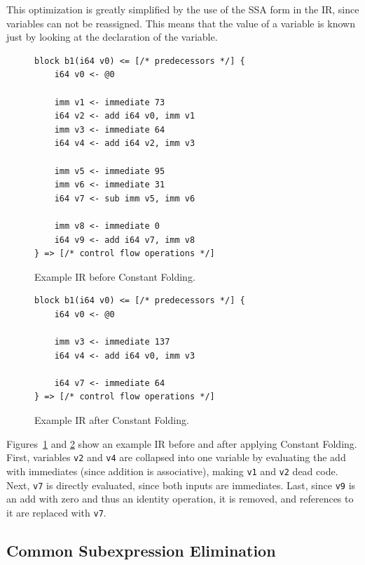 \documentclass[course=eragp]{aspdoc}
\begin{document}
This optimization is greatly simplified by the use of the SSA form in the IR, since variables can not be
reassigned. This means that the value of a variable is known just by looking at the declaration of the variable.

\begin{figure}[H]
    \centering
    \begin{lstlisting}[]
block b1(i64 v0) <= [/* predecessors */] {
    i64 v0 <- @0

    imm v1 <- immediate 73
    i64 v2 <- add i64 v0, imm v1
    imm v3 <- immediate 64
    i64 v4 <- add i64 v2, imm v3

    imm v5 <- immediate 95
    imm v6 <- immediate 31
    i64 v7 <- sub imm v5, imm v6

    imm v8 <- immediate 0
    i64 v9 <- add i64 v7, imm v8
} => [/* control flow operations */]
\end{lstlisting}
    \caption{Example IR before Constant Folding.}\label{fig:const_folding_example_before}
\end{figure}

\begin{figure}[H]
    \centering
    \begin{lstlisting}[]
block b1(i64 v0) <= [/* predecessors */] {
    i64 v0 <- @0

    imm v3 <- immediate 137
    i64 v4 <- add i64 v0, imm v3

    i64 v7 <- immediate 64
} => [/* control flow operations */]
\end{lstlisting}
    \caption{Example IR after Constant Folding.}\label{fig:const_folding_example_after}
\end{figure}

Figures~\ref{fig:const_folding_example_before} and \ref{fig:const_folding_example_after} show an example IR before and
after applying Constant Folding. First, variables \texttt{v2} and \texttt{v4} are collapsed into one variable by
evaluating the add with immediates (since addition is associative), making \texttt{v1} and \texttt{v2} dead
code. Next, \texttt{v7} is directly evaluated, since both inputs are immediates. Last, since \texttt{v9} is an add with
zero and thus an identity operation, it is removed, and references to it are replaced with \texttt{v7}.

\subsection{Common Subexpression Elimination}
\end{document}
